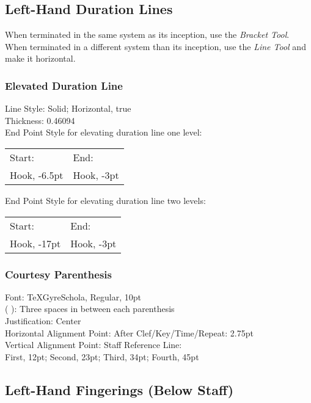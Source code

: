 \documentclass[10pt,twoside]{article} %
\begin{document}
\subsection{Left-Hand Duration Lines}
\label{sec:left-hand-duration}

When terminated in the same system as its inception, use the \emph{Bracket Tool}.\\
When terminated in a different system than its inception, use the \emph{Line Tool} and make it horizontal.

\subsubsection{Elevated Duration Line}
\label{sec:elev-durat-line}

Line Style: Solid; Horizontal, true\\
Thickness: 0.46094\\
End Point Style for elevating duration line one level:\\
\begin{tabular}{l l}
  Start: & End:\\
  Hook, -6.5pt & Hook, -3pt\\
\end{tabular}

\noindent End Point Style for elevating duration line two levels:\\
\begin{tabular}{l l}
  Start: & End:\\
  Hook, -17pt & Hook, -3pt\\
\end{tabular}

\subsubsection{Courtesy Parenthesis}
\label{sec:courtesy-parenthesis}

Font: TeXGyreSchola, Regular, 10pt\\
(   ): Three spaces in between each parenthesis\\
Justification: Center\\
Horizontal Alignment Point: After Clef/Key/Time/Repeat: 2.75pt\\
Vertical Alignment Point: Staff Reference Line:\\
\indent First, 12pt; Second, 23pt; Third, 34pt; Fourth, 45pt

\subsection{Left-Hand Fingerings (Below Staff)}
\label{sec:left-hand-fingerings}
\end{document}
